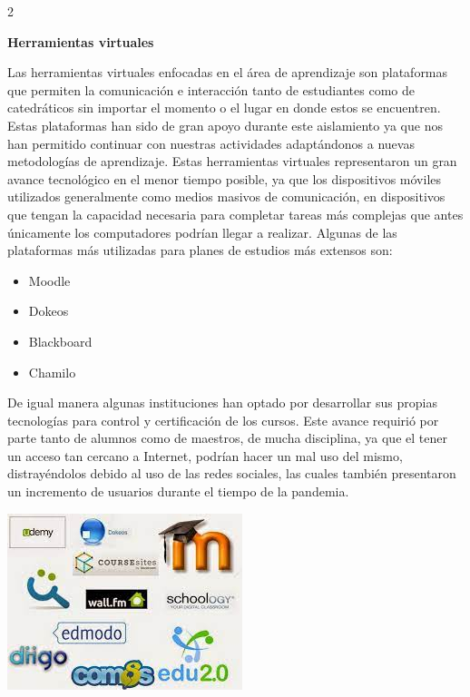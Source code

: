 \documentclass[12pt,spanish,Letterpaper,openany]{book}
\providecommand{\tightlist}{%
  \setlength{\itemsep}{0pt}\setlength{\parskip}{0pt}}
\begin{document}
\begin {multicols}{2}
\begin {flushleft}
\begin{minipage}[c]{\columnwidth}
\end{minipage}
\end {flushleft}

\textbf{Herramientas virtuales}

Las herramientas virtuales enfocadas en el área de aprendizaje son plataformas que permiten la comunicación e interacción tanto de estudiantes como de catedráticos sin importar el momento o el lugar en donde estos se encuentren. Estas plataformas han sido de gran apoyo durante este aislamiento ya que nos han permitido continuar con nuestras actividades adaptándonos a nuevas metodologías de aprendizaje. Estas herramientas virtuales representaron un gran avance tecnológico en el menor tiempo posible, ya que los dispositivos móviles utilizados generalmente como medios masivos de comunicación, en dispositivos que tengan la capacidad necesaria para completar tareas más complejas que antes únicamente los computadores podrían llegar a realizar. Algunas de las plataformas más utilizadas para planes de estudios más extensos son:

\begin{itemize}
\tightlist
\item
  Moodle
\item
  Dokeos
\item
  Blackboard
\item
  Chamilo
\end{itemize}

De igual manera algunas instituciones han optado por desarrollar sus propias tecnologías para control y certificación de los cursos. Este avance requirió por parte tanto de alumnos como de maestros, de mucha disciplina, ya que el tener un acceso tan cercano a Internet, podrían hacer un mal uso del mismo, distrayéndolos debido al uso de las redes sociales, las cuales también presentaron un incremento de usuarios durante el tiempo de la pandemia.

\begin {flushleft}
\noindent\begin{minipage}[c]{\columnwidth}
\centering

\includegraphics[width=1\linewidth]{images/pareja33_image3}


\end{minipage}
\end{flushleft}
\end{multicols}
\end{document}
